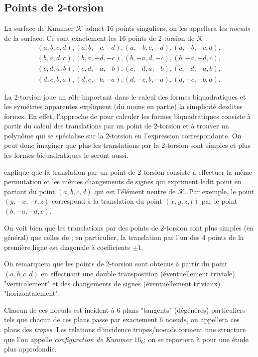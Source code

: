 \documentclass[a4paper,12pt]{article}
\theoremstyle{definition}
\theoremstyle{remark}
\numberwithin{equation}{section}
\begin{document}
\subsection{Points de 2-torsion}

La surface de Kummer $\mathcal{K}$ admet 16 points singuliers, on les appellera les \emph{noeuds} de la surface. Ce sont exactement les 16 points de 2-torsion de $\mathcal{K}$ :
\begin{align*}
   &(a,b,c,d),(a,b,-c,-d),(a,-b,c,-d),(a,-b,-c,d),& \\
   &(b,a,d,c),(b,a,-d,-c),(b,-a,d,-c),(b,-a,-d,c),& \\
   &(c,d,a,b),(c,d,-a,-b),(c,-d,a,-b),(c,-d,-a,b),& \\
   &(d,c,b,a),(d,c,-b,-a),(d,-c,b,-a),(d,-c,-b,a).&
\end{align*}

La 2-torsion joue un rôle important dans le calcul des formes biquadratiques et les symétries apparentes expliquent (du moins en partie) la simplicité desdites formes. 
En effet, l'approche de \citet{cassels-Flynn} pour calculer les formes biquadratiques consiste à partir du calcul des translations par un point de 2-torsion et à trouver un polynôme qui se spécialise sur la 2-torsion en l'expression correspondante.
On peut donc imaginer que plus les translations par la 2-torsion sont simples et plus les formes biquadratiques le seront aussi.

\citet{gaudry} explique que la translation par un point de 2-torsion consiste à effectuer la même permutation et les mêmes changements de signes qui expriment ledit point en partant du point $(a,b,c,d)$ qui est l'élément neutre de $\mathcal{K}$. Par exemple, le point $(y,-x,-t,z)$ correspond à la translation du point $(x,y,z,t)$ par le point $(b,-a,-d,c)$.

On voit bien que les translations par des points de 2-torsion sont plus simples (en général) que celles de \citet{eqKum}; en particulier, la translation par l'un des 4 points de la première ligne est diagonale à coefficients $\pm 1$.

On remarquera que les points de 2-torsion sont obtenus à partir du point $(a,b,c,d)$ en effectuant une double transposition (éventuellement triviale) "verticalement" et des changements de signes (éventuellement triviaux) "horizontalement".

Chacun de ces noeuds est incident à 6 plans "tangents" (dégénérés) particuliers tels que chacun de ces plans passe par exactement 6 noeuds, on appellera ces plans des \emph{tropes}. Les relations d'incidence tropes/noeuds forment une structure que l'on appelle \emph{configuration de Kummer} $16_6$; on se reportera à \citep{hudson} pour une étude plus approfondie.
\end{document}
